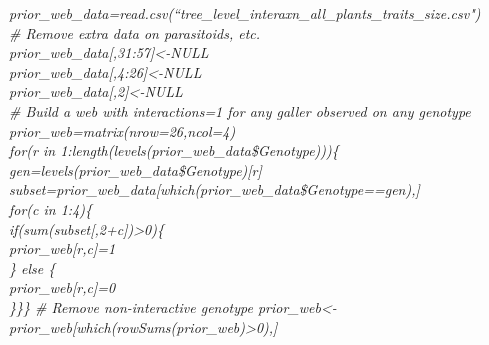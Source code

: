 \documentclass[12pt]{article}
\begin{document}
      \vspace{12pt}
      \emph{
      \noindent \hspace{-4pt} prior\_web\_data=read.csv(``tree\_level\_interaxn\_all\_plants\_traits\_size.csv")\\
      \# Remove extra data on parasitoids, etc.\\
      prior\_web\_data[,31:57]\textless-NULL\\
      prior\_web\_data[,4:26]\textless-NULL\\
      prior\_web\_data[,2]\textless-NULL\\
      \# Build a web with interactions=1 for any galler observed on any genotype\\
      prior\_web=matrix(nrow=26,ncol=4)\\
      for(r in 1:length(levels(prior\_web\_data\$Genotype)))\{\\
      \hspace{4pt}  gen=levels(prior\_web\_data\$Genotype)[r]\\
      \hspace{4pt}  subset=prior\_web\_data[which(prior\_web\_data\$Genotype==gen),]\\
      \hspace{4pt}  for(c in 1:4)\{\\
      \hspace{8pt}    if(sum(subset[,2+c])\textgreater0)\{\\
      \hspace{12pt}      prior\_web[r,c]=1\\
      \hspace{8pt}    \} else \{\\
      \hspace{12pt}      prior\_web[r,c]=0\\
      \hspace{8pt}    \}\}\}
      \# Remove non-interactive genotype
      prior\_web<-prior\_web[which(rowSums(prior\_web)\textgreater0),]
      }

\end{document}
